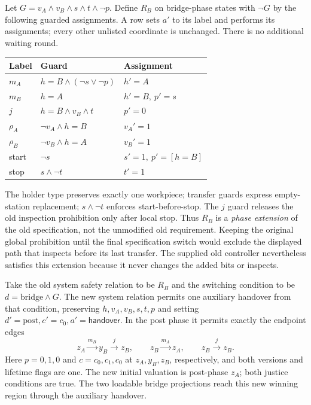 Let $G=v_A\land v_B\land s\land t\land\neg p$. Define $R_B$ on bridge-phase states with $\neg G$ by the following guarded assignments. A row sets $a'$ to its label and performs its assignments; every other unlisted coordinate is unchanged. There is no additional waiting round.
\begin{center}\small
\begin{tabular}{@{}lll@{}}\toprule
Label & Guard & Assignment\\\midrule
$m_A$ & $h=B\land(\neg s\lor\neg p)$ & $h'=A$\\
$m_B$ & $h=A$ & $h'=B,\ p'=s$\\
$j$ & $h=B\land v_B\land t$ & $p'=0$\\
$\rho_A$ & $\neg v_A\land h=B$ & $v_A'=1$\\
$\rho_B$ & $\neg v_B\land h=A$ & $v_B'=1$\\
start & $\neg s$ & $s'=1,\ p'=[h=B]$\\
stop & $s\land\neg t$ & $t'=1$\\\bottomrule
\end{tabular}
\end{center}
The holder type preserves exactly one workpiece; transfer guards express empty-station replacement; $s\land\neg t$ enforces start-before-stop. The $j$ guard releases the old inspection prohibition only after local stop. Thus $R_B$ is a \emph{phase extension} of the old specification, not the unmodified old requirement. Keeping the original global prohibition until the final specification switch would exclude the displayed path that inspects before its last transfer. The supplied old controller nevertheless satisfies this extension because it never changes the added bits or inspects.

Take the old system safety relation to be $R_B$ and the switching condition to be $d=\mathrm{bridge}\land G$. The new system relation permits one auxiliary handover from that condition, preserving $h,v_A,v_B,s,t,p$ and setting $d'=\mathrm{post},c'=c_0,a'=\mathsf{handover}$. In the post phase it permits exactly the endpoint edges
\[
 z_A\xrightarrow{m_B}y_B\xrightarrow{j}z_B,
 \qquad z_B\xrightarrow{m_A}z_A,
 \qquad z_B\xrightarrow{j}z_B.
\]
Here $p=0,1,0$ and $c=c_0,c_1,c_0$ at $z_A,y_B,z_B$, respectively, and both versions and lifetime flags are one. The new initial valuation is post-phase $z_A$; both justice conditions are true. The two loadable bridge projections reach this new winning region through the auxiliary handover.

